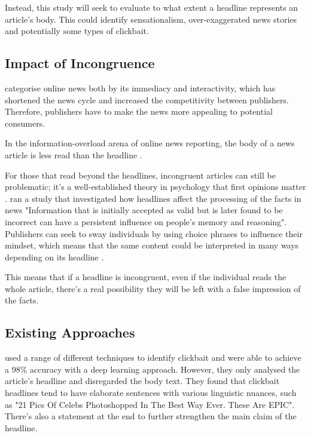 Instead, this study will seek to evaluate to what extent a headline represents an article's body. This could identify sensationalism, over-exaggerated news stories and potentially some types of clickbait.

\subsection{Impact of Incongruence}
 categorise online news both by its immediacy and interactivity, which has shortened the news cycle and increased the competitivity between publishers. Therefore, publishers have to make the news more appealing to potential consumers.

In the information-overload arena of online news reporting, the body of a news article is less read than the headline \cite{gabielkov2016}.  

For those that read beyond the headlines, incongruent articles can still be problematic; it's a well-established theory in psychology that first opinions matter \cite{digirolamo1997}.  ran a study that investigated how headlines affect the processing of the facts in news "Information that is initially accepted as valid but is later found to be incorrect can have a persistent influence on people’s memory and reasoning". Publishers can seek to sway individuals by using choice phrases to influence their mindset, which means that the same content could be interpreted in many ways depending on its headline \cite{reis2015}.

This means that if a headline is incongruent, even if the individual reads the whole article, there's a real possibility they will be left with a false impression of the facts. 


\subsection{Existing Approaches} \label{existing-approaches}

 used a range of different techniques to identify clickbait and were able to achieve a 98\% accuracy with a deep learning approach. However, they only analysed the article's headline and disregarded the body text.  They found that clickbait headlines tend to have elaborate sentences with various linguistic nuances, such as "21 Pics Of Celebs Photoshopped In The Best Way Ever. These Are EPIC". There's also a statement at the end to further strengthen the main claim of the headline.

